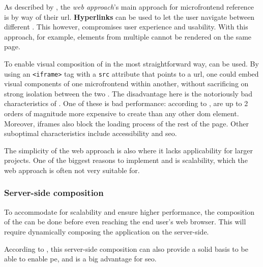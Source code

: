 As described by \textcite{Rappl_2021}, the \textit{web approach}'s main approach
for \gls{microfrontend} reference is by way of their \gls{url}.
\textbf{Hyperlinks} can be used to let the user navigate between different
. This however, compromises user experience and
usability. With this approach, for example, elements from multiple
 cannot be rendered on the same page. 

To enable visual composition of  in the most
straightforward way, \textbf{} can be used. By using an
\texttt{<iframe>} tag with a \texttt{src} attribute that points to a \gls{url},
one could embed visual components of one \gls{microfrontend} within another,
without sacrificing on strong isolation between the two \autocite{Geers_2020}.
The disadvantage here is the notoriously bad characteristics of
. One of these is bad performance: according to
\textcite{Souders_2013},  are up to 2 orders of magnitude more
expensive to create than any other \gls{dom} element. Moreover, iframes also
block the loading process of the rest of the page. Other suboptimal
characteristics include accessibility and \gls{seo}.

The simplicity of the web approach is also where it lacks applicability for
larger projects. One of the biggest reasons to implement
 and  is scalability, which the
web approach is often not very suitable for.

\subsubsection{Server-side composition}

To accommodate for scalability and ensure higher performance, the composition of
the  can be done before even reaching the end user's
web browser. This will require dynamically composing the application on the
server-side.

According to \textcite{Geers_2020}, this server-side composition can also
provide a solid basis to be able to enable \gls{pe}, and is a big advantage for
\gls{seo}.

